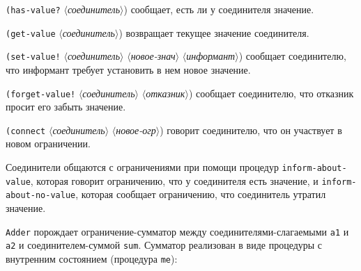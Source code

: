 \begin{plainlist}
\sloppy

\item

{\tt(has-value?} \textit{$\langle$соединитель$\rangle$})%
сообщает, есть ли у соединителя значение.

\item
{\tt (get-value} \textit{$\langle$соединитель$\rangle$})%
возвращает текущее значение соединителя.

\item
{\tt(set-value!} \textit{$\langle$соединитель$\rangle$} \textit{$\langle$новое-знач$\rangle$} \textit{$\langle$информант$\rangle$})%
 сообщает соединителю, что
информант требует установить в нем новое значение.

\item
{\tt (forget-value!} \textit{$\langle$соединитель$\rangle$} \textit{$\langle$отказник$\rangle$})%
 сообщает соединителю, что отказник просит его забыть значение.

\item
{\tt (connect} \textit{$\langle$соединитель$\rangle$} \textit{$\langle$новое-огр$\rangle$})%
 говорит соединителю, что он участвует в новом ограничении.

\sloppy
\end{plainlist}
Соединители общаются с ограничениями при помощи процедур
{\tt inform-about-value}, которая говорит ограничению, что у
соединителя есть значение, и {\tt inform-about-no-value},
которая сообщает ограничению, что соединитель утратил значение.
{\sloppy

}
{\tt Adder} порождает ограничение-сумматор между
соединителями-сла\-га\-е\-мы\-ми {\tt a1} и {\tt a2} и%
соединителем-суммой {\tt sum}. Сумматор реализован в виде
процедуры с внутренним состоянием (процедура {\tt me}):


